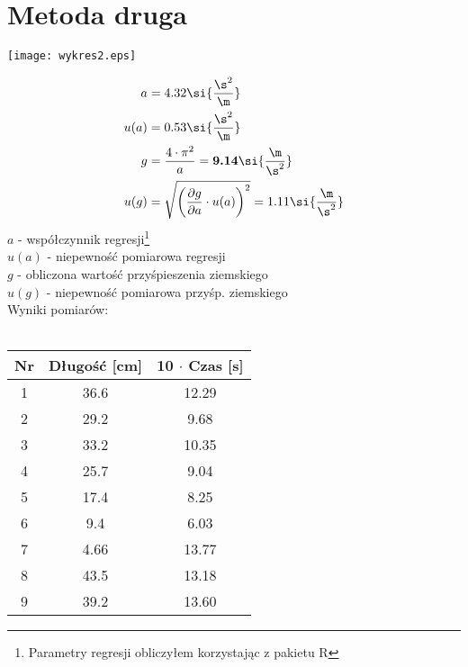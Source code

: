 \documentclass[12pt]{article}
\newenvironment{Figure}
  {\par\medskip\noindent\minipage{\linewidth}}
  {\endminipage\par\medskip}
\begin{document}
\section{Metoda druga}
\begin{multicols}{2}
\begin{Figure}
\centering
\texttt{[image: wykres2.eps]}
\end{Figure}

\begin{align}
a&= 4.32\si{\frac{\s^2}{\m}} \\
u(a)&= 0.53\si{\frac{\s^2}{\m}}  \\
g&=\frac{4 \cdot \pi^2}{a} = \textbf{9.14}\si{\frac{\m}{\s^2}} \\
u(g) &= \sqrt{ \left(\frac{\partial g}{\partial a} \cdot u(a)\right)^2}
= 1.11\si{\frac{\m}{\s^2}}
\end{align}
$a$ - współczynnik regresji\footnote{Parametry regresji obliczyłem korzystając z pakietu R}\\
$u(a)$ - niepewność pomiarowa regresji\\
$g$ - obliczona wartość przyśpieszenia ziemskiego \\
$u(g)$ - niepewność pomiarowa przyśp. ziemskiego
\columnbreak
\\
Wyniki pomiarów: \\
\\
\begin{tabular}{|c|c|c|}
\hline
Nr & Długość [cm] & 10 $\cdot$ Czas [s] \\ \hline
1  & 36.6         & 12.29    \\ \hline
2  & 29.2         & 9.68     \\ \hline
3  & 33.2         & 10.35    \\ \hline
4  & 25.7         & 9.04     \\ \hline
5  & 17.4         & 8.25     \\ \hline
6  & 9.4          & 6.03     \\ \hline
7  & 4.66         & 13.77    \\ \hline
8  & 43.5         & 13.18    \\ \hline
9  & 39.2         & 13.60    \\ \hline
\end{tabular}
\end{multicols}
\end{document}
